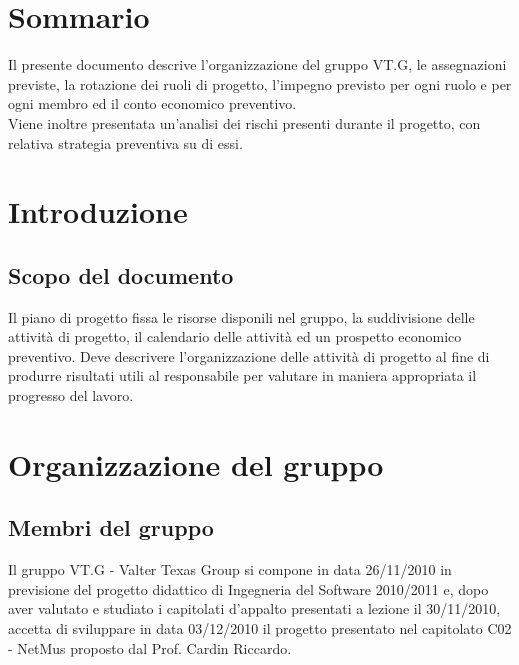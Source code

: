 \tableofcontents
\thispagestyle{fancy} %


\chapter*{Sommario}
Il presente documento descrive l'organizzazione del gruppo VT.G, le
assegnazioni previste, la rotazione dei ruoli di progetto, l'impegno previsto
per ogni ruolo e per ogni membro ed il conto economico preventivo.\\
Viene inoltre presentata un'analisi dei rischi presenti durante il progetto, con relativa strategia preventiva su di essi.


\thispagestyle{fancy} %

\chapter{Introduzione}
\thispagestyle{fancy} %

\section{Scopo del documento}
Il piano di progetto fissa le risorse disponili nel gruppo, la suddivisione
delle attivit\`a di progetto, il calendario delle attivit\`a ed un prospetto
economico preventivo. Deve descrivere l'organizzazione delle attivit\`a di
progetto al fine di produrre risultati utili al responsabile per valutare in
maniera appropriata il progresso del lavoro.




\chapter{Organizzazione del gruppo}
\thispagestyle{fancy}

\section{Membri del gruppo}
Il gruppo VT.G - Valter Texas Group si compone in data 26/11/2010 in previsione
del progetto didattico di Ingegneria del Software 2010/2011 e, dopo aver
valutato e studiato i capitolati d'appalto presentati a lezione il 30/11/2010,
accetta di sviluppare in data 03/12/2010 il progetto presentato nel capitolato
C02 - NetMus proposto dal Prof. Cardin Riccardo.\\


